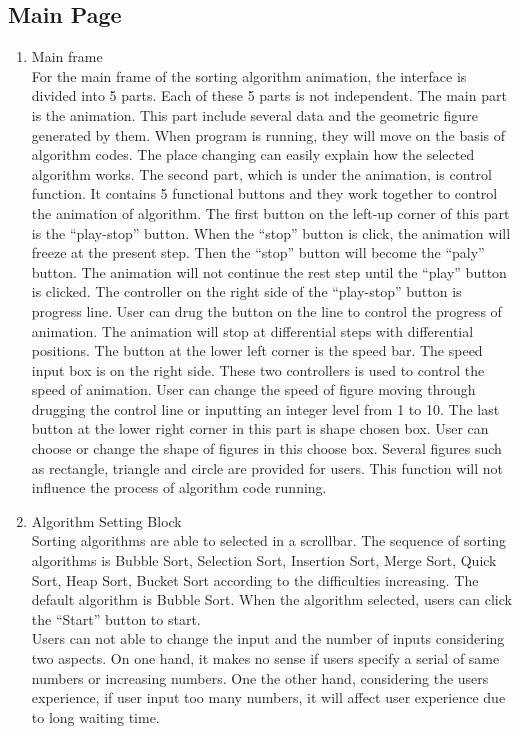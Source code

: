 \documentclass[paper=a4, fontsize=11pt,twoside]{scrartcl}		%
\begin{document}
\subsection{Main Page}
\begin{enumerate}
\item  Main frame \\For the main frame of the sorting algorithm animation, the interface is divided into 5 parts. Each of these 5 parts is not independent. The main part is the animation. This part include several data and the geometric figure generated by them. When program is running, they will move on the basis of algorithm codes. The place changing can easily explain how the selected algorithm works. The second part, which is under the animation, is control function. It contains 5 functional buttons and they work together to control the animation of algorithm. The first button on the left-up corner of this part is the “play-stop” button. When the “stop” button is click, the animation will freeze at the present step. Then the “stop” button will become the “paly” button. The animation will not continue the rest step until the “play” button is clicked. The controller on the right side of the “play-stop” button is progress line. User can drug the button on the line to control the progress of animation. The animation will stop at differential steps with differential positions. The button at the lower left corner is the speed bar. The speed input box is on the right side. These two controllers is used to control the speed of animation. User can change the speed of figure moving through drugging the control line or inputting an integer level from 1 to 10. The last button at the lower right corner in this part is shape chosen box. User can choose or change the shape of figures in this choose box. Several figures such as rectangle, triangle and circle are provided for users. This function will not influence the process of algorithm code running. 

\item Algorithm Setting Block \\
Sorting algorithms are able to selected in a scrollbar. The sequence of sorting algorithms is Bubble Sort, Selection Sort, Insertion Sort, Merge Sort, Quick Sort, Heap Sort, Bucket Sort according to the difficulties increasing. The default algorithm is Bubble Sort. When the algorithm selected, users can click the “Start” button to start. \\
Users can not able to change the input and the number of inputs considering two aspects. On one hand, it makes no sense if users specify a serial of same numbers or increasing numbers. One the other hand, considering the users experience, if user input too many numbers, it will affect user experience due to long waiting time. 


\end{enumerate}
\end{document}
